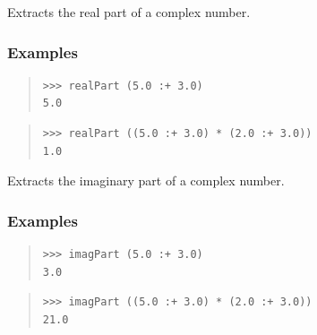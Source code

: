\begin{haddockdesc}
\item[\begin{tabular}{@{}l}
realPart :: Complex a -> a
\end{tabular}]
{\haddockbegindoc
Extracts the real part of a complex number.\par
\subsubsection*{\textbf{Examples}}
\begin{quote}
{\haddockverb\begin{verbatim}
>>> realPart (5.0 :+ 3.0)
5.0

\end{verbatim}}
\end{quote}
\begin{quote}
{\haddockverb\begin{verbatim}
>>> realPart ((5.0 :+ 3.0) * (2.0 :+ 3.0))
1.0

\end{verbatim}}
\end{quote}}
\end{haddockdesc}
\begin{haddockdesc}
\item[\begin{tabular}{@{}l}
imagPart :: Complex a -> a
\end{tabular}]
{\haddockbegindoc
Extracts the imaginary part of a complex number.\par
\subsubsection*{\textbf{Examples}}
\begin{quote}
{\haddockverb\begin{verbatim}
>>> imagPart (5.0 :+ 3.0)
3.0

\end{verbatim}}
\end{quote}
\begin{quote}
{\haddockverb\begin{verbatim}
>>> imagPart ((5.0 :+ 3.0) * (2.0 :+ 3.0))
21.0

\end{verbatim}}
\end{quote}}
\end{haddockdesc}
